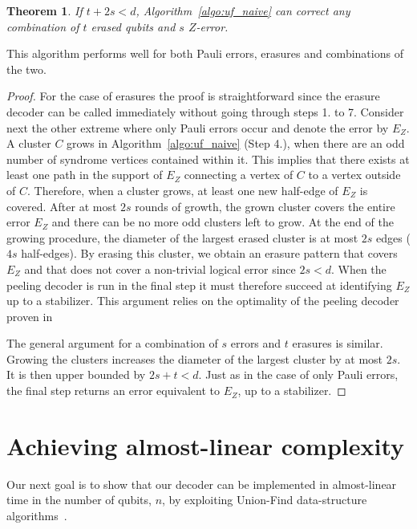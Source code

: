\documentclass[a4paper, 10pt, accepted=2021-11-03]{quantumarticle}
\newtheorem{theo}{Theorem}
\begin{document}
\begin{theo} \label{theo:UF_perf}
If $t + 2s<d$, Algorithm~\ref{algo:uf_naive} can correct any 
combination of $t$ erased qubits and $s$ $Z$-error.
\end{theo}

This algorithm performs well for both Pauli errors, erasures and combinations of the two. 

\begin{proof}
For the case of erasures the proof is straightforward since the erasure decoder can be called 
immediately without going through steps 1. to 7.
Consider next the other extreme where only Pauli errors occur and denote the error by
$E_Z$.
A cluster $C$ grows in Algorithm~\ref{algo:uf_naive} (Step 4.), 
when there are an odd number of syndrome vertices contained within it.
This implies that there exists at least one path in the support of $E_Z$
connecting a vertex of $C$ to a vertex outside of $C$.
Therefore, when a cluster grows, at least one new half-edge of $E_Z$ is covered.
After at most $2s$ rounds of growth, the grown cluster covers 
the entire error $E_Z$ and there can be no more odd clusters left to grow.
At the end of the growing procedure, the diameter of the largest erased
cluster is at most $2s$ edges ($4s$ half-edges). 
By erasing this cluster, we obtain an erasure pattern that covers $E_Z$ 
and that does not cover a non-trivial logical error since $2s < d$. 
When the peeling decoder is run in the final step it must therefore succeed at identifying $E_Z$ up 
to a stabilizer. This argument relies on the optimality of the peeling decoder proven in \cite{delfosse2017:linear_decoding}

The general argument for a combination of $s$ errors and $t$ erasures is similar. 
Growing the clusters increases the diameter of the largest cluster by at 
most $2s$. It is then upper bounded by $2s+t<d$. Just as in the case of only Pauli errors, the final 
step returns an error equivalent to $E_Z$, up to a stabilizer.
\end{proof}



\section{Achieving almost-linear complexity\label{sec:complexity}}

Our next goal is to show that our decoder can be implemented in almost-linear time
in the number of qubits, $n$, by exploiting Union-Find data-structure 
algorithms~\cite{galler1964:union_find_algorithm, tarjan1975:union_find_complexity}.
\end{document}
